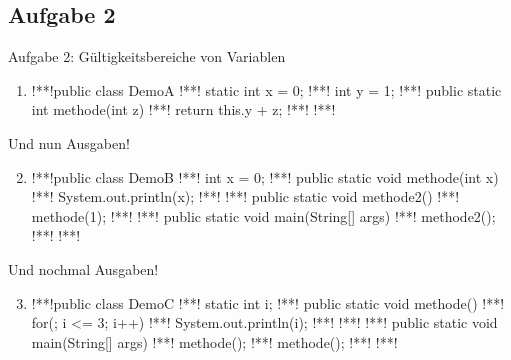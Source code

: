 \subsection{Aufgabe 2}
{\taskenum
\begin{frame}[fragile]{Aufgabe 2: Gültigkeitsbereiche von Variablen}
\begin{enumerate}[<+(1)->]
    \item {}
\begin{plainjava}
!**!public class DemoA {
!**!    static int x = 0;
!**!    int y = 1;
!**!    public static int methode(int z){
!**!        return this.y + z;
!**!    }
!**!}
\end{plainjava}
\end{enumerate}
\end{frame}


\begin{frame}[fragile]{Und nun Ausgaben!}
\begin{enumerate}[<+(1)->]
    \setcounter{enumi}{1}
    \item {}
\begin{plainjava}
!**!public class DemoB {
!**!    int x = 0;
!**!    public static void methode(int x){
!**!        System.out.println(x);
!**!    }
!**!    public static void methode2(){
!**!        methode(1);
!**!    }
!**!    public static void main(String[] args){
!**!        methode2();
!**!    }
!**!}
\end{plainjava}
\end{enumerate}
\end{frame}

\begin{frame}[fragile]{Und nochmal Ausgaben!}
\begin{enumerate}[<+(1)->]
    \setcounter{enumi}{2}
    \item {}
\begin{plainjava}
!**!public class DemoC {
!**!    static int i;
!**!    public static void methode(){
!**!        for(; i <= 3; i++){
!**!            System.out.println(i);
!**!        }
!**!    }
!**!    public static void main(String[] args){
!**!        methode();
!**!        methode();
!**!    }
!**!}
\end{plainjava}
\end{enumerate}
\end{frame}
}

